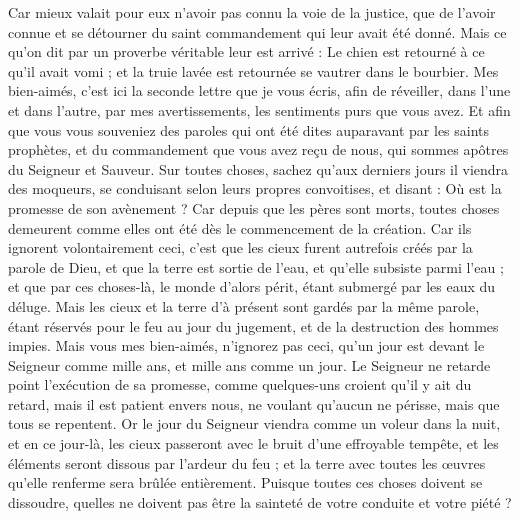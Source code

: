 \begin{multicols}{2}
Car mieux valait pour eux n'avoir pas connu la voie de la justice, que de l'avoir connue et se détourner du saint commandement qui leur avait été donné.
Mais ce qu'on dit par un proverbe véritable leur est arrivé : Le chien est retourné à ce qu'il avait vomi ; et la truie lavée est retournée se vautrer dans le bourbier.
\VerseOne{}Mes bien-aimés, c'est ici la seconde lettre que je vous écris, afin de réveiller, dans l'une et dans l'autre, par mes avertissements, les sentiments purs que vous avez.
Et afin que vous vous souveniez des paroles qui ont été dites auparavant par les saints prophètes, et du commandement que vous avez reçu de nous, qui sommes apôtres du Seigneur et Sauveur.
Sur toutes choses, sachez qu'aux derniers jours il viendra des moqueurs, se conduisant selon leurs propres convoitises,
et disant : Où est la promesse de son avènement ? Car depuis que les pères sont morts, toutes choses demeurent comme elles ont été dès le commencement de la création.
Car ils ignorent volontairement ceci, c’est que les cieux furent autrefois créés par la parole de Dieu, et que la terre est sortie de l'eau, et qu'elle subsiste parmi l'eau ;
et que par ces choses-là, le monde d'alors périt, étant submergé par les eaux du déluge.
Mais les cieux et la terre d’à présent sont gardés par la même parole, étant réservés pour le feu au jour du jugement, et de la destruction des hommes impies.
Mais vous mes bien-aimés, n'ignorez pas ceci, qu'un jour est devant le Seigneur comme mille ans, et mille ans comme un jour.
Le Seigneur ne retarde point l'exécution de sa promesse, comme quelques-uns croient qu'il y ait du retard, mais il est patient envers nous, ne voulant qu'aucun ne périsse, mais que tous se repentent.
Or le jour du Seigneur viendra comme un voleur dans la nuit, et en ce jour-là, les cieux passeront avec le bruit d’une effroyable tempête, et les éléments seront dissous par l'ardeur du feu ; et la terre avec toutes les œuvres qu’elle renferme sera brûlée entièrement.
Puisque toutes ces choses doivent se dissoudre, quelles ne doivent pas être la sainteté de votre conduite et votre piété ?

\end{multicols}
